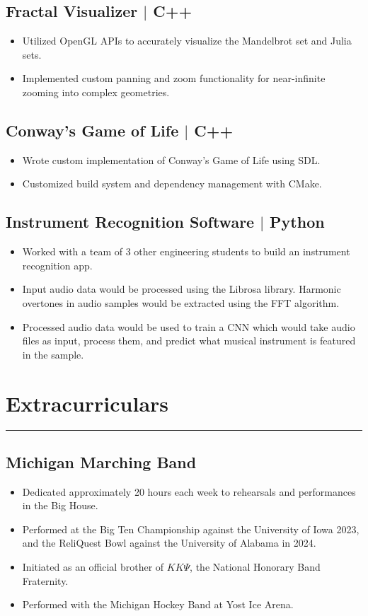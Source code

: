 \documentclass[10pt, letterpaper]{article}
\begin{document}
\subsection*{Fractal Visualizer $\vert$ C++}
\begin{itemize}[noitemsep]
    \item Utilized OpenGL APIs to accurately visualize the Mandelbrot set and Julia sets.
    \item Implemented custom panning and zoom functionality for near-infinite zooming into complex geometries.
\end{itemize}

\subsection*{Conway's Game of Life $\vert$ C++}
\begin{itemize}[noitemsep]
	\item Wrote custom implementation of Conway's Game of Life using SDL.
	\item Customized build system and dependency management with CMake.
\end{itemize}

\subsection*{Instrument Recognition Software $\vert$ Python}
\begin{itemize}[noitemsep]
	\item Worked with a team of 3 other engineering students to build an instrument recognition app.
	\item Input audio data would be processed using the Librosa library. Harmonic overtones in audio samples would be extracted using the FFT algorithm.
	\item Processed audio data would be used to train a CNN which would take audio files as input, process them,
	and predict what musical instrument is featured in the sample.
\end{itemize}

\section*{Extracurriculars}
\hrule
\vspace{3pt}

\subsection*{Michigan Marching Band}
\begin{itemize}[noitemsep]
	\item Dedicated approximately 20 hours each week to rehearsals and performances in the Big House.
	\item Performed at the Big Ten Championship against the University of Iowa 2023,
		and the ReliQuest Bowl against the University of Alabama in 2024.
	\item Initiated as an official brother of $KK\Psi$, the National Honorary Band Fraternity.
    \item Performed with the Michigan Hockey Band at Yost Ice Arena.
\end{itemize}
\end{document}
